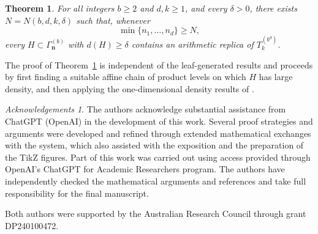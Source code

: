 \documentclass[11pt]{amsart}
\renewcommand{\geq}{\geqslant}
\theoremstyle{plain}
\newtheorem{thmAlph}{Theorem}[section]
\theoremstyle{definition}
\theoremstyle{remark}
\newtheorem*{ack}{Acknowledgements}
\begin{document}
\begin{thmAlph}\label{Th: Product density result}
For all integers $b\geq2$ and $d,k\geq1$, and every $\delta>0$,
there exists $N=N(b,d,k,\delta)$ such that, whenever
\[
\min\{n_1,\ldots,n_d\}\geq N,
\]
every $H\subset\Gamma_{\mathbf n}^{(b)}$ with $d(H)\geq\delta$
contains an arithmetic replica of $T_k^{(b^d)}$.
\end{thmAlph}

The proof of Theorem~\ref{Th: Product density result} is independent of the leaf-generated results and proceeds by first finding a suitable affine chain of product levels on which $H$ has large density, and then applying the one-dimensional density results of \cite{PST}.


\begin{ack}
The authors acknowledge substantial assistance from ChatGPT
(OpenAI) in the development of this work. Several proof strategies
and arguments were developed and refined through extended
mathematical exchanges with the system, which also assisted with
the exposition and the preparation of the TikZ figures.
Part of this work was carried out using access provided through
OpenAI's ChatGPT for Academic Researchers program.
The authors have independently checked the mathematical arguments
and references and take full responsibility for the final manuscript.
\end{ack}
Both authors were supported by the Australian Research Council through grant DP240100472.
\end{document}
